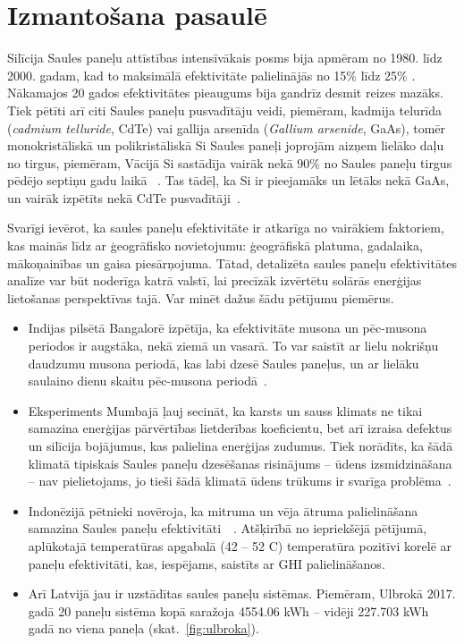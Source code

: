 \section{Izmantošana pasaulē}

Silīcija Saules paneļu attīstības intensīvākais posms bija apmēram no 1980. līdz 2000. gadam, kad to maksimālā efektivitāte palielinājās no 15\% līdz 25\%
\cite{Sivaram}. Nākamajos 20 gados efektivitātes pieaugums bija gandrīz desmit reizes mazāks. Tiek pētīti arī citi Saules paneļu pusvadītāju veidi, piemēram, kadmija telurīda (\textit{cadmium telluride}, CdTe) vai gallija arsenīda (\textit{Gallium arsenide}, GaAs), tomēr monokristāliskā un polikristāliskā Si Saules paneļi joprojām aizņem lielāko daļu no tirgus, piemēram, Vācijā Si sastādīja vairāk nekā 90\% no Saules paneļu tirgus pēdējo septiņu gadu laikā ~\cite{prognoze}. Tas tādēļ, ka Si ir pieejamāks un lētāks nekā GaAs\cite{hayes_clemens_2015}, un vairāk izpētīts nekā CdTe pusvadītāji~\cite{Sivaram}.

Svarīgi ievērot, ka saules paneļu efektivitāte ir atkarīga no vairākiem faktoriem, kas mainās līdz ar ģeogrāfisko novietojumu: ģeogrāfiskā platuma, gadalaika, mākoņainības un gaisa piesārņojuma. Tātad, detalizēta saules paneļu efektivitātes analīze var būt noderīga katrā valstī, lai precīzāk izvērtētu solārās enerģijas lietošanas perspektīvas tajā. Var minēt dažus šādu pētījumu piemērus.
\begin{itemize}
  \item Indijas pilsētā Bangalorē izpētīja, ka efektivitāte musona un pēc-musona periodos ir augstāka, nekā ziemā un vasarā. To var saistīt ar lielu nokrišņu daudzumu musona periodā, kas labi dzesē Saules paneļus, un ar lielāku saulaino dienu skaitu pēc-musona periodā~\cite{effectCloudsOnSurface}.
  \item Eksperiments Mumbajā ļauj secināt, ka karsts un sauss klimats ne tikai samazina enerģijas pārvērtības lietderības koeficientu, bet arī izraisa defektus un silīcija bojājumus, kas palielina enerģijas zudumus. Tiek norādīts, ka šādā klimatā tipiskais Saules paneļu dzesēšanas risinājums -- ūdens izsmidzināšana -- nav pielietojams, jo tieši šādā klimatā ūdens trūkums ir svarīga problēma~\cite{improvePerformance}.
  \item Indonēzijā pētnieki novēroja, ka mitruma un vēja ātruma palielināšana samazina Saules paneļu efektivitāti~\cite{improvePerformance}~\cite{Sani_2018}. Atšķirībā no iepriekšējā pētījumā, aplūkotajā temperatūras apgabalā (42 -- 52 \textdegree C) temperatūra pozitīvi korelē ar paneļu efektivitāti, kas, iespējams, saistīts ar GHI palielināšanos. 
  \item Arī Latvijā jau ir uzstādītas saules paneļu sistēmas. Piemēram, Ulbrokā 2017. gadā 20 paneļu sistēma kopā saražoja 4554.06 kWh -- vidēji 227.703 kWh gadā no viena paneļa (skat.~\ref{fig:ulbroka}).
\end{itemize}


